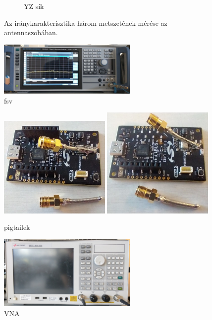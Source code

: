 \documentclass[a4paper,12pt,titlepage]{article}
\begin{document}
\begin{figure}
\begin{subfigure}{0.3\textwidth}
                    \caption{YZ sík}
                \end{subfigure}
                \caption{Az iránykarakterisztika három metszetének mérése az antennaszobában.}
                \label{fig:botantenna}
            \end{figure}
%
            \begin{figure}
                \centering
                \includegraphics[width=0.6\textwidth]{kep/szerkesztett/fsv.jpg}
                \caption{fsv}
                \label{fig:fsv}
            \end{figure}
%
            \begin{figure}
                \centering
                \includegraphics[width=0.48\textwidth]{kep/szerkesztett/pigtail1.jpg}
                \includegraphics[width=0.48\textwidth]{kep/szerkesztett/pigtail2.jpg}
                \caption{pigtailek}
                \label{fig:pigtail}
            \end{figure}
%
            \begin{figure}
                \centering
                \includegraphics[width=0.6\textwidth]{kep/szerkesztett/vna.jpg}
                \caption{VNA}
                \label{fig:vna}
            \end{figure}
\end{document}
